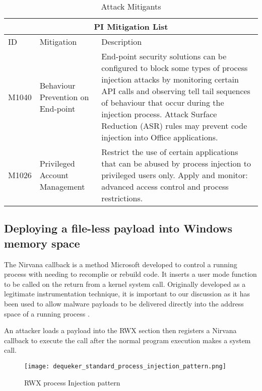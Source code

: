 \begin{table}[!ht]
  \centering
  \caption{Attack Mitigants \autocite{Mitre:2017}}
\begin{tabular}{ |p{1.2cm}||p{2cm}|p{10.2cm}|  }
  \hline
  \multicolumn{3}{|c|}{PI Mitigation List} \\
  \hline
  ID	& Mitigation & Description \\
  \hline
  M1040	& Behaviour Prevention on End-point &	End-point security solutions can be configured to block some types of
                                            process injection attacks by monitoring certain API calls
                                            and observing tell tail sequences of behaviour that occur during the
                                            injection process.  Attack Surface Reduction (ASR)
                                            rules may prevent code injection into Office applications.\\
  \hline
  M1026 & Privileged Account Management	& Restrict the use of certain applications that can be abused by
                                          process injection to privileged users only. Apply and monitor: advanced access control and
                                          process restrictions. \\
  \hline
\end{tabular}
\label{table: Mitigations}
\end{table}


\subsection{Deploying a file-less payload into Windows memory space}

The Nirvana callback is a method Microsoft developed to control a running process with needing to recomplie or rebuild code.
It inserts a user mode function to be called on the return from a kernel system call.
Originally developed as a legitimate instrumentation technique,
it is important to our discussion as it has been used to allow malware payloads to be delivered directly into the
address space of a running process \autocite{Dequeker:2023}.

An attacker loads a payload into the RWX section then registers a Nirvana callback to execute the call after the normal program
execution makes a system call.

\begin{figure}[ht]
\texttt{[image: dequeker\_standard\_process\_injection\_pattern.png]}
\caption{RWX process Injection pattern \autocite{Dequeker:2023}}
\end{figure}
 
